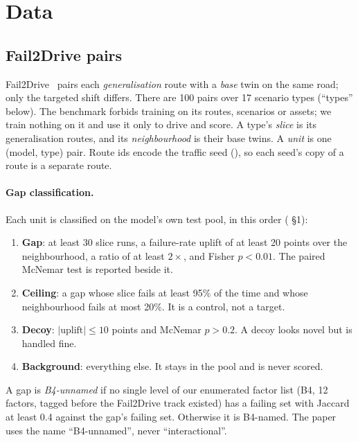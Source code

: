 \section{Data}
\label{sec:data}

\subsection{Fail2Drive pairs}
\label{sec:fail2drive}

Fail2Drive~\cite{gerstenecker2026fail2drive} pairs each \emph{generalisation}
route with a \emph{base} twin on the same road; only the targeted shift differs.
There are 100 pairs over 17 scenario types (``types'' below). The benchmark
forbids training on its routes, scenarios or assets; we train nothing on it and
use it only to drive and score. A type's \emph{slice} is its generalisation
routes, and its \emph{neighbourhood} is their base twins. A \emph{unit} is one
(model, type) pair. Route ids encode the traffic seed
(), so each seed's copy of a route is a separate route.

\paragraph{Gap classification.}
Each unit is classified on the model's own test pool, in this order
( \S1):
\begin{enumerate}
  \item \textbf{Gap}: at least 30 slice runs, a failure-rate uplift of at least
        20 points over the neighbourhood, a ratio of at least $2\times$, and
        Fisher $p < 0.01$. The paired McNemar test is reported beside it.
  \item \textbf{Ceiling}: a gap whose slice fails at least 95\% of the time and
        whose neighbourhood fails at most 20\%. It is a control, not a target.
  \item \textbf{Decoy}: $|\text{uplift}| \le 10$ points and McNemar $p > 0.2$.
        A decoy looks novel but is handled fine.
  \item \textbf{Background}: everything else. It stays in the pool and is never
        scored.
\end{enumerate}
A gap is \emph{B4-unnamed} if no single level of our enumerated factor list (B4,
12 factors, tagged  before the Fail2Drive track existed) has a
failing set with Jaccard at least 0.4 against the gap's failing set. Otherwise it
is B4-named. The paper uses the name ``B4-unnamed'', never ``interactional''.

